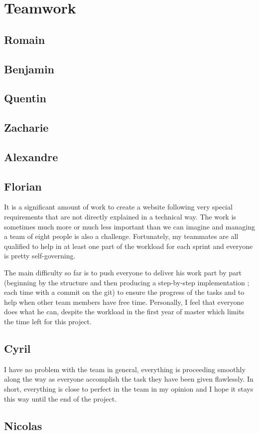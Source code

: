 \section{Teamwork}

\subsection{Romain}
\subsection{Benjamin}
\subsection{Quentin}
\subsection{Zacharie}
\subsection{Alexandre}
\subsection{Florian}
It is a significant amount of work to create a website following very
special requirements that are not directly explained in a technical way.
The work is sometimes much more or much less important than we can imagine and
managing a team of eight people is also a challenge. Fortunately, my
teammates are all qualified to help in at least one part of the workload for
each sprint and everyone is pretty self-governing. \newline

The main difficulty so far is to push everyone to deliver his work part by
part (beginning by the structure and then producing a step-by-step
implementation ; each time with a commit on the git) to ensure the progress
of the tasks and to help when other team members have free time.
Personally, I feel that everyone does what he can, despite the workload in
the first year of master which limits the time left for this project.\newline

\subsection{Cyril}

I have no problem with the team in general, everything is proceeding
smoothly along the way as everyone accomplish the task they have been given
flawlessly. In short, everything is close to perfect in the team in my
opinion and I hope it stays this way until the end of the project.
\subsection{Nicolas}
